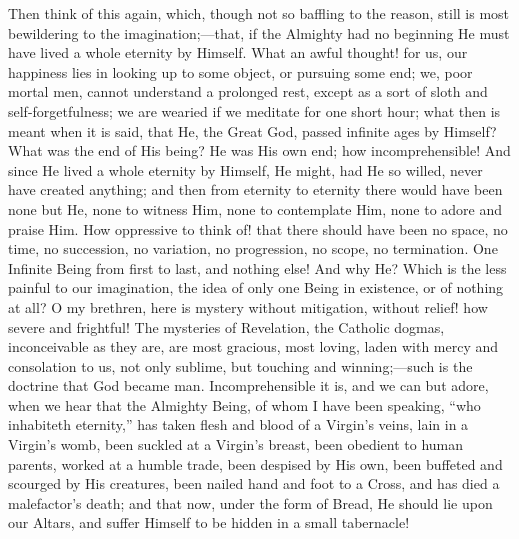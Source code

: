 Then think of this again, which, though not so baffling to the
reason, still is most bewildering to the imagination;—that, if the
Almighty had no beginning He must have lived a whole eternity by
Himself. What an awful thought! for us, our happiness lies in looking
up to some object, or pursuing some end; we, poor mortal men, cannot
understand a prolonged rest, except as a sort of sloth and
self-forgetfulness; we are wearied if we meditate for one short hour;
what then is meant when it is said, that He, the Great God, passed
infinite ages by Himself? What was the end of His being? He was His
own end; how incomprehensible! And since He lived a whole eternity by
Himself, He might, had He so willed, never have created anything; and
then from eternity to eternity there would have been none but He, none
to witness Him, none to contemplate Him, none to adore and praise Him.
How oppressive to think of! that there should have been no space, no
time, no succession, no variation, no progression, no scope, no
termination. One Infinite Being from first to last, and nothing else!
And why He? Which is the less painful to our imagination, the idea of
only one Being in existence, or of nothing at all? O my brethren, here
is mystery without mitigation, without relief! how severe and
frightful! The mysteries of Revelation, the Catholic dogmas,
inconceivable as they are, are most gracious, most loving, laden with
mercy and consolation to us, not only sublime, but touching and
winning;—such is the doctrine that God became man. Incomprehensible
it is, and we can but adore, when we hear that the Almighty Being, of
whom I have been speaking, ``who inhabiteth eternity,'' has
taken flesh and blood of a Virgin's veins, lain in a Virgin's womb,
been suckled at a Virgin's breast, been obedient to human parents,
worked at a humble trade, been despised by His own, been buffeted and
scourged by His creatures, been nailed hand and foot to a Cross, and
has died a malefactor's death; and that now, under the form of Bread,
He should lie upon our Altars, and suffer Himself to be hidden in a
small tabernacle!

